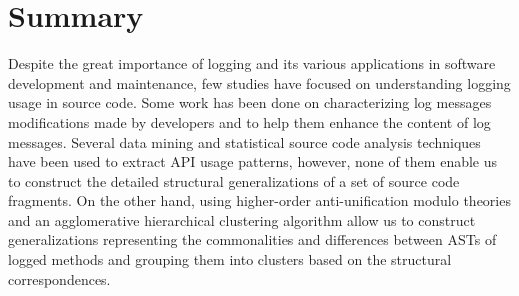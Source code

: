 
\section{Summary}  \label{back-summary}

Despite the great importance of logging and its various applications in software development and maintenance, few studies have focused on understanding logging usage in source code.
Some work has been done on characterizing log messages modifications made by developers and to help them enhance the content of log messages. Several data mining and statistical source code analysis techniques have been used to extract API usage patterns, however, none of them enable us to construct the detailed structural generalizations of a set of source code fragments. On the other hand, using higher-order anti-unification modulo theories and an agglomerative hierarchical clustering algorithm allow us to construct generalizations representing the commonalities and differences between ASTs of logged methods and grouping them into clusters based on the structural correspondences.
